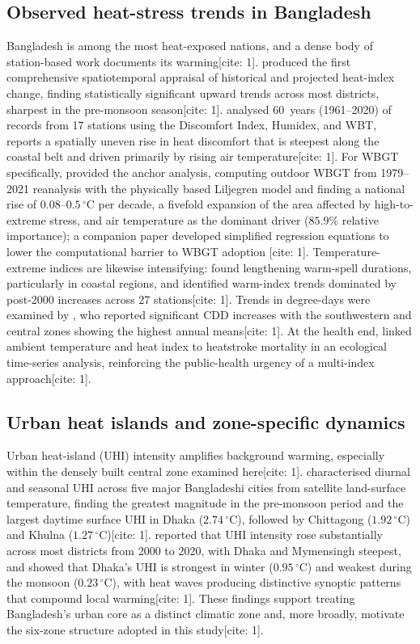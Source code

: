 \documentclass[pdflatex,sn-mathphys-ay]{sn-jnl}
\newcommand{\degC}{\ensuremath{^{\circ}\mathrm{C}}}
\begin{document}
\subsection{Observed heat-stress trends in Bangladesh}
Bangladesh is among the most heat-exposed nations, and a dense body of station-based work documents its warming[cite: 1]. \citet{rahman2021} produced the first comprehensive spatiotemporal appraisal of historical and projected heat-index change, finding statistically significant upward trends across most districts, sharpest in the pre-monsoon season[cite: 1]. \citet{tanim2024heat} analysed 60~years (1961--2020) of records from 17 stations using the Discomfort Index, Humidex, and WBT, reports a spatially uneven rise in heat discomfort that is steepest along the coastal belt and driven primarily by rising air temperature[cite: 1]. For WBGT specifically, \citet{kamal2024scientific} provided the anchor analysis, computing outdoor WBGT from 1979--2021 reanalysis with the physically based Liljegren model and finding a national rise of $0.08$--$0.5\,\degC$ per decade, a fivefold expansion of the area affected by high-to-extreme stress, and air temperature as the dominant driver ($85.9\%$ relative importance); a companion paper developed simplified regression equations to lower the computational barrier to WBGT adoption \citep{kamal2024ijc}[cite: 1]. Temperature-extreme indices are likewise intensifying: \citet{ahmed2022} found lengthening warm-spell durations, particularly in coastal regions, and \citet{islam2021extremes} identified warm-index trends dominated by post-2000 increases across 27 stations[cite: 1]. Trends in degree-days were examined by \citet{islam2020cdd}, who reported significant CDD increases with the southwestern and central zones showing the highest annual means[cite: 1]. At the health end, \citet{miah2026} linked ambient temperature and heat index to heatstroke mortality in an ecological time-series analysis, reinforcing the public-health urgency of a multi-index approach[cite: 1].

\subsection{Urban heat islands and zone-specific dynamics}
Urban heat-island (UHI) intensity amplifies background warming, especially within the densely built central zone examined here[cite: 1]. \citet{dewan2021} characterised diurnal and seasonal UHI across five major Bangladeshi cities from satellite land-surface temperature, finding the greatest magnitude in the pre-monsoon period and the largest daytime surface UHI in Dhaka ($2.74\,\degC$), followed by Chittagong ($1.92\,\degC$) and Khulna ($1.27\,\degC$)[cite: 1]. \citet{faisal2022} reported that UHI intensity rose substantially across most districts from 2000 to 2020, with Dhaka and Mymensingh steepest, and \citet{park2024} showed that Dhaka's UHI is strongest in winter ($0.95\,\degC$) and weakest during the monsoon ($0.23\,\degC$), with heat waves producing distinctive synoptic patterns that compound local warming[cite: 1]. These findings support treating Bangladesh's urban core as a distinct climatic zone and, more broadly, motivate the six-zone structure adopted in this study[cite: 1].
\end{document}
